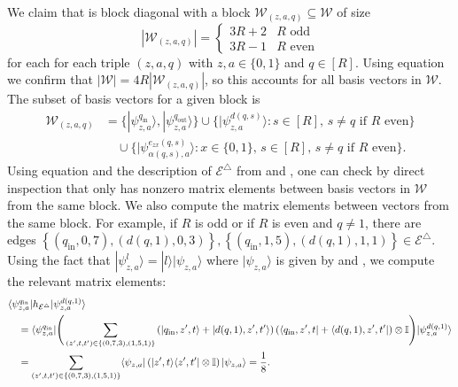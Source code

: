 \documentclass[../thesis-main/thesis-main]{subfiles}
\begin{document}
We claim that  is block diagonal with a block $\mathcal{W}_{(z,a,q)}\subseteq\mathcal{W}$ of size
\[
\left|\mathcal{W}_{(z,a,q)}\right|=\begin{cases}
3R+2 & R\text{ odd}\\
3R-1 & R\text{ even}
\end{cases}
\]
for each for each triple $(z,a,q)$ with $z,a\in\{0,1\}$ and $q\in[R]$. Using equation  we confirm that $|\mathcal{W}|=4R\left|\mathcal{W}_{(z,a,q)}\right|$, so this accounts for all basis vectors in $\mathcal{W}$. The subset of basis vectors for a given block is
\begin{align}
\mathcal{W}_{(z,a,q)} 
&=\big\{ |\psi_{z,a}^{q_{\text{in}}}\rangle,|\psi_{z,a}^{q_{\text{out}}}\rangle\big\} \cup\big\{ |\psi_{z,a}^{d(q,s)}\rangle\colon s\in[R],\, s\neq q\text{ if }R\text{ even}\big\} \nonumber \\
 &\quad \cup \big\{ |\psi_{\alpha(q,s),a}^{e_{zx}(q,s)}\rangle\colon x\in\{0,1\},\, s\in[R],\, s\neq q\text{ if }R\text{ even}\big\} .\label{eq:subset_W}
\end{align}
Using equation  and the description of $\mathcal{E}^{\triangle}$ from  and , one can check by direct inspection that  only has nonzero matrix elements between basis vectors in $\mathcal{W}$ from the same block. We also compute the matrix elements between vectors from the same block. For example, if $R$ is odd or if $R$ is even and $q\neq1$, there are edges $\left\{ (q_{\text{in}},0,7),(d(q,1),0,3)\right\} ,\left\{ (q_{\text{in}},1,5),(d(q,1),1,1)\right\} \in\mathcal{E^{\triangle}}$. Using the fact that $|\psi_{z,a}^{l}\rangle=|l\rangle|\psi_{z,a}\rangle$ where $|\psi_{z,a}\rangle$ is given by  and , we compute the relevant matrix elements:
\begin{align*}
&\langle\psi_{z,a}^{q_{\text{in}}}|h_{\mathcal{E}^{\triangle}}|\psi_{z,a}^{d(q,1)}\rangle \\ 
&\quad=\langle\psi_{z,a}^{q_{\text{in}}}|\Bigg(\sum_{(z',t,t^{\prime})\in\{(0,7,3),(1,5,1)\}}\left(|q_{\text{in}},z',t\rangle+|d(q,1),z',t^{\prime}\rangle\right)\left(\langle q_{\text{in}},z',t|+\langle d(q,1),z',t^{\prime}|\right)\otimes\mathbb{I}\Bigg)|\psi_{z,a}^{d(q,1)}\rangle\\
&\quad=\sum_{(z',t,t^{\prime})\in\{(0,7,3),(1,5,1)\}}\langle\psi_{z,a}|\left(|z',t\rangle\langle z',t^{\prime}|\otimes\mathbb{I}\right)|\psi_{z,a}\rangle
=\frac{1}{8}.
\end{align*}
\end{document}
